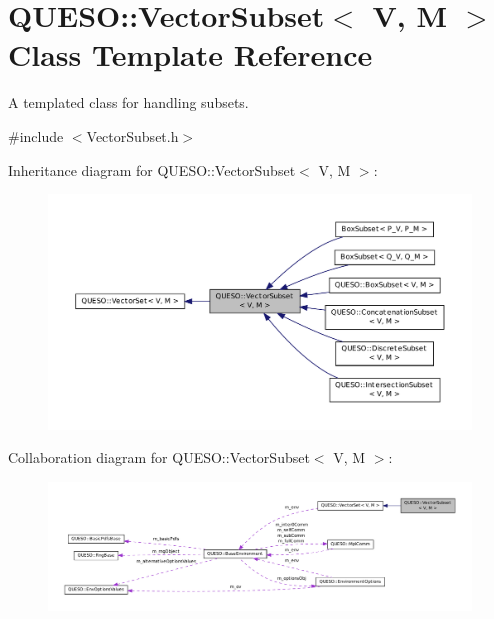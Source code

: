 \hypertarget{class_q_u_e_s_o_1_1_vector_subset}{\section{Q\-U\-E\-S\-O\-:\-:Vector\-Subset$<$ V, M $>$ Class Template Reference}
\label{class_q_u_e_s_o_1_1_vector_subset}
}


A templated class for handling subsets.  




{\ttfamily \#include $<$Vector\-Subset.\-h$>$}



Inheritance diagram for Q\-U\-E\-S\-O\-:\-:Vector\-Subset$<$ V, M $>$\-:
\nopagebreak
\begin{figure}[H]
\begin{center}
\leavevmode
\includegraphics[width=350pt]{class_q_u_e_s_o_1_1_vector_subset__inherit__graph}
\end{center}
\end{figure}


Collaboration diagram for Q\-U\-E\-S\-O\-:\-:Vector\-Subset$<$ V, M $>$\-:
\nopagebreak
\begin{figure}[H]
\begin{center}
\leavevmode
\includegraphics[width=350pt]{class_q_u_e_s_o_1_1_vector_subset__coll__graph}
\end{center}
\end{figure}
